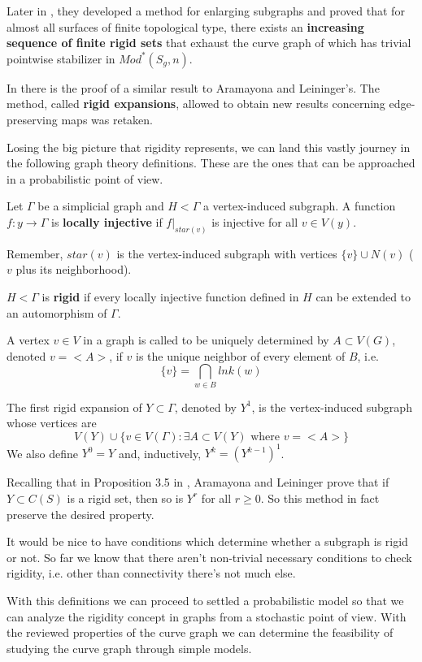 Later in \cite[Aramayona, Leininger 16]{exhaustingCurveComplex}, they developed a method for enlarging subgraphs and proved that for almost all surfaces of finite topological type, there exists an \textbf{increasing sequence of finite rigid sets} that exhaust the curve graph of which has trivial pointwise stabilizer in $Mod^{\ast}(S_{g},n)$.

In \cite[Hernández 19]{exhaustionCurveGraph} there is the proof of a similar result to Aramayona and Leininger's. The method,  called \textbf{rigid expansions}, allowed to obtain new results concerning edge-preserving maps was retaken. 

Losing the big picture that rigidity represents, we can land this vastly journey in the following graph theory definitions. These are the ones that can be approached in a probabilistic point of view.

\begin{defini}
Let $\Gamma$ be a simplicial graph and $H<\Gamma$ a vertex-induced subgraph. A function $f:y\to \Gamma$ is \textbf{locally injective} if $f|_{star(v)}$ is injective for all $v \in V(y)$. 
\end{defini}

\begin{nota}
Remember, $star(v)$ is the vertex-induced subgraph with vertices $\{ v \} \cup N(v)$ ($v$ plus its neighborhood).
\end{nota}

\begin{defini}
$H<\Gamma$ is \textbf{rigid} if every locally injective function defined in $H$ can be extended to an automorphism of $\Gamma$. \end{defini}

A vertex $v \in V$ in a graph is called to be uniquely determined by $A\subset V(G)$, denoted $v=<A>$, if $v$ is the unique neighbor of every element of $B$, i.e.
$$ \{ v \} = \bigcap_{w\in B} lnk(w) $$
\begin{defini}
The first rigid expansion of $Y\subset \Gamma$, denoted by $Y^{1}$, is the vertex-induced subgraph whose vertices are
$$ V(Y) \cup \{ v\in V(\Gamma) :  \exists A \subset V(Y) \text{ where } v = <A>  \}$$
We also define $Y^{0} = Y$ and, inductively, $Y^{k} = (Y^{k-1})^{1}$.
\end{defini}

Recalling that in Proposition 3.5 in \cite[Aramayona, Leininger 16]{finiteRigidSetsJA}, Aramayona and Leininger prove that if $Y \subset C(S)$ is a rigid set, then so is $Y^{r} $ for all $r \geq 0$. So this method in fact preserve the desired property.

It would be nice to have conditions which determine whether a subgraph is rigid or not. So far we know that there aren't non-trivial necessary conditions to check rigidity, i.e. other than connectivity there's not much else.

With this definitions we can proceed to settled a probabilistic model so that we can analyze the rigidity concept in graphs from a stochastic point of view. With the reviewed properties of the curve graph we can determine the feasibility of studying the curve graph through simple models.